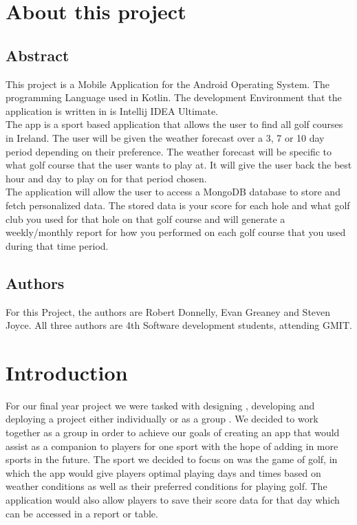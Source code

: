 
\chapter{About this project}
\section{Abstract}
This project is a Mobile Application for the Android Operating System. The programming Language used in Kotlin. The development Environment that the application is written in is Intellij IDEA Ultimate. \\
The app is a sport based application that allows the user to find all golf courses in Ireland. The user will be given the weather forecast over a 3, 7 or 10 day period depending on their preference. The weather forecast will be specific to what golf course that the user wants to play at. It will give the user back the best hour and day to play on for that period chosen. \\ 
The application will allow the user to access a MongoDB database to store and fetch personalized data. The stored data is your score for each hole and what golf club you used for that hole on that golf course and will generate a weekly/monthly report for how you performed on each golf course that you used during that time period.\\
\section{Authors}
For this Project, the authors are Robert Donnelly, Evan Greaney and Steven Joyce. All three authors are 4th Software development students, attending GMIT.
\chapter{Introduction}

For our final year project we were tasked with designing , developing and deploying a project either individually or as a group . We decided to work together as a group in order to achieve our goals of creating an app that would assist as a companion to players for one sport with the hope of adding in more sports in the future. The sport we decided to focus on was the game of golf, in which the app would give players optimal playing days and times based on weather conditions as well as their preferred conditions for playing golf. The application would also allow players to save their score data for that day which can be accessed in a report or table.

